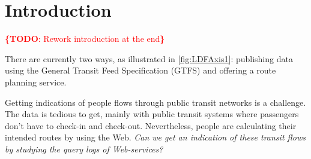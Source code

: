 \documentclass{sig-alternate}
\newcommand{\todo}[1]{\noindent\textcolor{red}{{\bf \{TODO}: #1{\bf \}}}}
\begin{document}
\vspace{1em}

\section{Introduction}
\label{sec:introduction}

\todo{Rework introduction at the end}

There are currently two ways, as illustrated in \cref{fig:LDFAxis1}: publishing data using the General Transit Feed Specification (GTFS) and offering a route planning service.



%

Getting indications of people flows through public transit networks is a challenge.
The data is tedious to get, mainly with public transit systems where passengers don't have to check-in and check-out.
Nevertheless, people are calculating their intended routes by using the Web.
\emph{Can we get an indication of these transit flows by studying the query logs of Web-services?}
\end{document}
